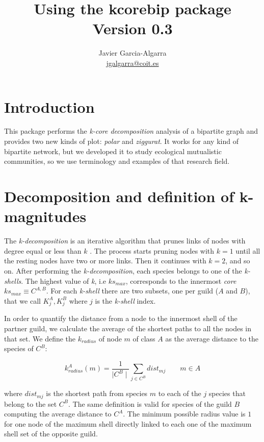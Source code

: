 \documentclass[12pt]{article}
\title{Using the kcorebip package \\ \small{Version 0.3}}
\author{Javier Garcia-Algarra \\ \href{mailto:jgalgarra@coit.es}{jgalgarra@coit.es} }
\begin{document}
\flushbottom
\maketitle
\thispagestyle{empty}

\section*{Introduction}

This package performs the \textit{k-core decomposition} analysis of a bipartite graph and provides two new kinds of plot: \textit{polar} and \textit{ziggurat}. It works for
any kind of bipartite network, but we developed it to study ecological mutualistic communities, so we use terminology and examples of that research field.

\section*{Decomposition and definition of k-magnitudes}
\label{K-magnitudes}

The \textit{k-decomposition} is an iterative algorithm that prunes links of nodes with degree equal or less than $k$ \cite{seidman1983network}. The process starts pruning nodes with $k=1$ until all the resting nodes have two or more links. Then it continues with $k=2$, and so on. After performing the \textit{k-decomposition}, each species belongs to one of the \textit{k-shells}. The highest value of \textit{k}, i.e $ks_{max}$, corresponds to the innermost \textit{core} $ks_{max}\equiv C^{A,B}$. For each \textit{k-shell} there are two subsets, one per guild ($A$ and $B$), that we call $K^{A}_{j}, K^{B}_{j}$ where $j$ is the \textit{k-shell} index.

In order to quantify the distance from a node to the innermost shell of the partner guild, we calculate the average of the shortest paths to all the nodes in that set. We define the \textit{$k_{radius}$} of node $m$ of class $A$ as the average distance to the species of $C^B$:

\begin{equation}
\displaystyle
k^A_{radius}(m) = \frac{1}{\mid C^{B} \mid}\sum\limits_{j \in C^{B}} dist_{mj}  \qquad   m \in A
\label{kradius}
\end{equation}

\noindent where $dist_{mj}$ is the shortest path from species $m$ to each of the $j$ species that belong to the set $C^B$. The same definition is valid for species of the guild $B$ computing the average distance to $C^A$. The minimum possible radius value is $1$ for one node of the maximum shell directly linked to each one of the maximum shell set of the opposite guild.
\end{document}
